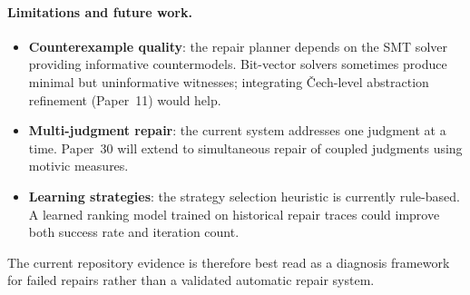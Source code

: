 \documentclass[11pt]{article}
\begin{document}
\paragraph{Limitations and future work.}
\begin{itemize}[itemsep=2pt]
  \item \textbf{Counterexample quality}: the repair planner depends on the
        SMT solver providing informative countermodels.  Bit-vector solvers
        sometimes produce minimal but uninformative witnesses; integrating
        Čech-level abstraction refinement (Paper~11) would help.
  \item \textbf{Multi-judgment repair}: the current system addresses one
        judgment at a time.  Paper~30 will extend to simultaneous repair of
        coupled judgments using motivic measures.
  \item \textbf{Learning strategies}: the strategy selection heuristic is
        currently rule-based.  A learned ranking model trained on historical
        repair traces could improve both success rate and iteration count.
\end{itemize}

The current repository evidence is therefore best read as a diagnosis
framework for failed repairs rather than a validated automatic repair
system.
\end{document}
